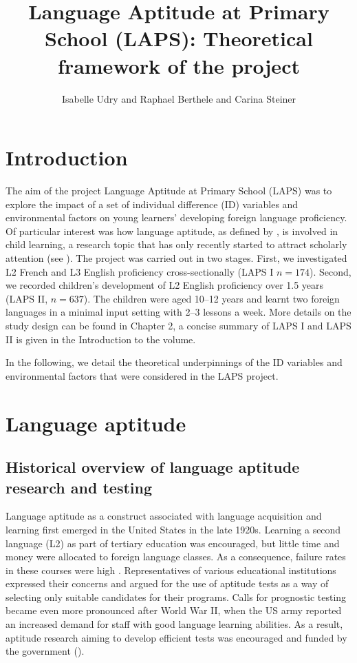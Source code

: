 \documentclass[output=paper]{langscibook}
\author{Isabelle Udry\orcid{}\affiliation{University of Fribourg, Institut de Plurilinguisme; Zurich University of Teacher Education} and Raphael Berthele\orcid{}\affiliation{University of Fribourg, Institut de Plurilinguisme} and Carina Steiner\orcid{}\affiliation{University of Berne, Center for the Study of Language and Society}}
\title[Theoretical framework of the LAPS project]
      {Language Aptitude at Primary School (LAPS): 
      Theoretical framework of the project }
\begin{document}
\maketitle 

\section{Introduction}

The aim of the project Language Aptitude at Primary School (LAPS) was to explore the impact of a set of individual difference (ID) variables and environmental factors on young learners’ developing foreign language proficiency. Of particular interest was how language aptitude, as defined by \citet{Carroll1958}, is involved in child learning, a research topic that has only recently started to attract scholarly attention (see ). The project was carried out in two stages. First, we investigated L2 French and L3 English proficiency cross-sectionally (LAPS I $n=174$). Second, we recorded children’s development of L2 English proficiency over 1.5 years (LAPS II, $n=637$). The children were aged 10--12 years and learnt two foreign languages in a minimal input setting with 2--3 lessons a week. More details on the study design can be found in Chapter 2, a concise summary of LAPS I and LAPS II is given in the Introduction to the volume. 

In the following, we detail the theoretical underpinnings of the ID variables and environmental factors that were considered in the LAPS project. 

\section{Language aptitude}\label{sec:01:2}
\subsection{Historical overview of language aptitude research and testing}\label{sec:01:2.1} %

Language aptitude as a construct associated with language acquisition and learning first emerged in the United States in the late 1920s. Learning a second language (L2) as part of tertiary education was encouraged, but little time and money were allocated to foreign language classes. As a consequence, failure rates in these courses were high \citep{Spolsky1995}. Representatives of various educational institutions expressed their concerns and argued for the use of aptitude tests as a way of selecting only suitable candidates for their programs. Calls for prognostic testing became even more pronounced after World War II, when the US army reported an increased demand for staff with good language learning abilities. As a result, aptitude research aiming to develop efficient tests was encouraged and funded by the government (\citealt{StansfieldReed2004}). 
\end{document}
